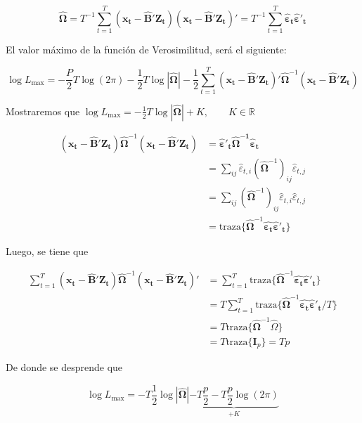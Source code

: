 \documentclass[12pt, twoside]{book}\usepackage[]{graphicx}\usepackage[]{color}
\let\bold\boldsymbol
\numberwithin{equation}{section}
\numberwithin{theorem}{section}
\numberwithin{teorema}{section}
\numberwithin{defi}{section}
\numberwithin{prop}{section}
\numberwithin{defi}{section}
\theoremstyle{plain}
\begin{document}
{{\begin{equation}
\boldsymbol{\hat{\Omega}} = T^{-1}\sum_{t=1}^{T}(\bold{x_{t}-\hat{B}'Z_{t}})(\bold{x_{t}-\hat{B}'Z_{t}})' = T^{-1}\sum_{t=1}^{T}\boldsymbol{\hat{\varepsilon}_{t}\hat{\varepsilon}'_{t}}
\end{equation}

El valor máximo de la función de Verosimilitud, será el siguiente: 

\begin{equation}
\log L _{\max} = -\frac{P}{2}T\log (2\pi)-\frac{1}{2}T\log|\boldsymbol{\hat{\Omega}}|-\frac{1}{2}\sum_{t=1}^{T}(\bold{x_{t}-\hat{B}'Z_{t}})'\boldsymbol{\hat{\Omega}}^{-1}(\bold{x_{t}-\hat{B}'Z_{t}}) 
\end{equation}

Mostraremos que $\log L_{\max} = -\frac{1}{2}T\log |\boldsymbol{\hat{\Omega}}|+K, \qquad K\in \mathbb{R}$

\begin{align}
(\boldsymbol{x_{t}-\hat{B}'Z_{t}})\boldsymbol{\hat{\Omega}}^{-1}(\bold{x_{t}-\hat{B}'Z_{t}}) 
& = \boldsymbol{\hat{\varepsilon}'_{t}\boldsymbol{\hat{\Omega}}^{-1}\hat{\varepsilon}_{t}} \nonumber \\
& = \sum_{ij}\hat{\varepsilon}_{t,i}(\boldsymbol{\hat{\Omega}}^{-1})_{ij}\hat{\varepsilon}_{t,j} \\
& = \sum_{ij}(\boldsymbol{\hat{\Omega}}^{-1})_{ij}\hat{\varepsilon}_{t,i}\hat{\varepsilon}_{t,j} \nonumber \\ 
& = \text{traza}\{\boldsymbol{\hat{\Omega}}^{-1}\boldsymbol{\hat{\varepsilon_{t}}\hat{\varepsilon}'_{t}}\}
\end{align}

Luego, se tiene que 

\begin{align}
\sum_{t=1}^{T}(\bold{x_{t}-\hat{B}'Z_{t}})\boldsymbol{\hat{\Omega}}^{-1}(\bold{x_{t}-\hat{B}'Z_{t}})' & = \sum_{t=1}^{T}\text{traza}\{\boldsymbol{\hat{\Omega}}^{-1}\boldsymbol{\hat{\varepsilon_{t}}\hat{\varepsilon}'_{t}}\} \\
& = T \sum_{t=1}^{T}\text{traza}\{\boldsymbol{\hat{\Omega}}^{-1}\boldsymbol{\hat{\varepsilon_{t}}\hat{\varepsilon}'_{t}}/T\} \\ 
& = T \text{traza}\{\boldsymbol{\hat{\Omega}}^{-1}\hat{\Omega}\} \\ 
& = T \text{traza}\{\bold{I}_{p}\} = Tp
\end{align}

De donde se desprende que 

\begin{equation}
\log L_{\max} = -T \frac{1}{2} \log |\boldsymbol{\hat{\Omega}}|\underbrace{-T\frac{p}{2}-T\frac{p}{2}\log(2\pi)}_{+K}
\end{equation}

}}
\end{document}
